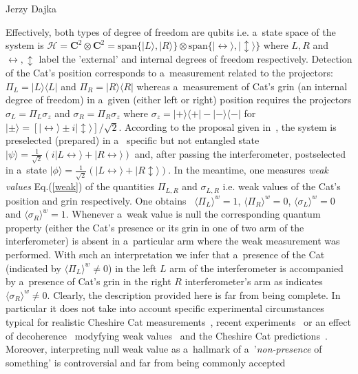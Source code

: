 \begin{artengenv}{Jerzy Dajka}
\begin{figure}
\end{figure}
Effectively, both types of degree of freedom are qubits i.e. a~state space of the  system is
$\mathcal{H}=\mathbf{C}^2\otimes\mathbf{C}^2=\mbox{span}\{|L\rangle,|R\rangle\}\otimes\mbox{span}\{|\leftrightarrow\rangle,|\updownarrow\rangle\}$  
where $L,R$ and $\leftrightarrow,\updownarrow$ label the 'external' and internal degrees of freedom respectively. 
Detection of  the Cat's position  corresponds to a~measurement related to the projectors: $\Pi_L=|L\rangle\langle L|$ and $
\Pi_R=|R\rangle\langle R|$
whereas a~measurement of Cat's grin (an internal degree of freedom) in a~given (either left or right) position requires the projectors $\sigma_L = \Pi_L \sigma_z$ and $\sigma_R =  \Pi_R \sigma_z$
where  $\sigma_z=|+\rangle\langle+|-|-\rangle\langle -|$ for $|\pm\rangle=[|\leftrightarrow\rangle \pm i|\updownarrow\rangle]/\sqrt{2}$. 
%
According to the proposal given in~\parencite{cat}, the system is preselected (prepared) in a~ specific but not entangled state
$|\psi\rangle = \frac{1}{\sqrt{2}}\left(i|L\leftrightarrow\rangle +|R \leftrightarrow\rangle\right)$
and, after passing the interferometer,  postselected in a~state
$|\phi\rangle = \frac{1}{\sqrt{2}}\left( |L\leftrightarrow\rangle +|R \updownarrow\rangle\right)$.   
%
In the meantime, one measures {\it weak values} Eq.(\ref{weak}) of the quantities $\Pi_{L,R}$ and $\sigma_{L,R}$ i.e. weak values of the Cat's position and grin respectively. One obtains~\parencite{cat}
$
\langle \Pi_L\rangle^w =1$,
$\langle \Pi_R\rangle^w=0$, 
$\langle \sigma_L\rangle^w =0$ and $\langle \sigma_R\rangle^w=1$. 
% 
Whenever a~weak value is null the corresponding quantum property (either the Cat's presence or its grin in one of two arm of the interferometer) is absent in a~particular arm  where the weak measurement was performed. With such an interpretation we infer that a~presence of the Cat (indicated by $
\langle \Pi_L\rangle^w \neq 0$) in the left $L$ arm of the interferometer is accompanied by a~presence of Cat's grin in the right $R$ interferometer's arm as indicates $\langle \sigma_R\rangle^w\neq 0$. Clearly, the description provided here is far from being complete. In particular it does not take into account specific experimental circumstances typical for realistic Cheshire Cat measurements~\parencite{dup}, recent experiments~\parencite{c2,cat_schlos} or an effect of decoherence~\parencite{schloss} modyfying weak values~\parencite{Shik} and the Cheshire Cat predictions~\parencite{mojkot,mojkot1}. Moreover, interpreting null weak value as a~hallmark of a~'{\it non-presence} of something' is controversial and  far from being commonly accepted  

\end{artengenv}
